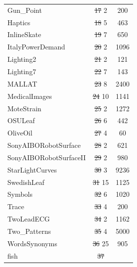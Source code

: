 \documentclass[natbib,smallextended]{svjour3}
\providecommand{\DIFdeltex}[1]{{\protect\color{red}\sout{#1}}}                      %
\providecommand{\DIFdelFL}[1]{\DIFdel{#1}} %
\providecommand{\DIFdelbeginFL}{} %
\providecommand{\DIFdelendFL}{} %
\providecommand{\DIFdel}[1]{\texorpdfstring{\DIFdeltex{#1}}{}} %
\begin{document}
\begin{table} [h!]
\begin{center}
\begin{tabular}{lcc}
Gun\_Point &   \DIFdelbeginFL \DIFdelFL{17 }%
\DIFdelendFL 2 &  200 \\
Haptics &   \DIFdelbeginFL \DIFdelFL{18 }%
\DIFdelendFL 5 &  463 \\
InlineSkate  &  \DIFdelbeginFL \DIFdelFL{19 }%
\DIFdelendFL 7 &  650 \\
ItalyPowerDemand  &  \DIFdelbeginFL \DIFdelFL{20 }%
\DIFdelendFL 2 & 1096 \\
Lighting2  &  \DIFdelbeginFL \DIFdelFL{21 }%
\DIFdelendFL 2 &  121 \\
Lighting7  &  \DIFdelbeginFL \DIFdelFL{22 }%
\DIFdelendFL 7 &  143 \\
MALLAT  &  \DIFdelbeginFL \DIFdelFL{23 }%
\DIFdelendFL 8 & 2400 \\
MedicalImages  & \DIFdelbeginFL \DIFdelFL{24 }%
\DIFdelendFL 10 & 1141 \\
MoteStrain  &  \DIFdelbeginFL \DIFdelFL{25 }%
\DIFdelendFL 2 & 1272 \\
OSULeaf &   \DIFdelbeginFL \DIFdelFL{26 }%
\DIFdelendFL 6 &  442 \\
OliveOil &   \DIFdelbeginFL \DIFdelFL{27 }%
\DIFdelendFL 4 &   60 \\
SonyAIBORobotSurface &   \DIFdelbeginFL \DIFdelFL{28 }%
\DIFdelendFL 2 &  621 \\
SonyAIBORobotSurfaceII &   \DIFdelbeginFL \DIFdelFL{29 }%
\DIFdelendFL 2 &  980 \\
StarLightCurves  &  \DIFdelbeginFL \DIFdelFL{30 }%
\DIFdelendFL 3 & 9236 \\
SwedishLeaf & \DIFdelbeginFL \DIFdelFL{31 }%
\DIFdelendFL 15 & 1125 \\
Symbols  &  \DIFdelbeginFL \DIFdelFL{32 }%
\DIFdelendFL 6 & 1020 \\
Trace &   \DIFdelbeginFL \DIFdelFL{33 }%
\DIFdelendFL 4 &  200 \\
TwoLeadECG  &  \DIFdelbeginFL \DIFdelFL{34 }%
\DIFdelendFL 2 & 1162 \\
Two\_Patterns  &  \DIFdelbeginFL \DIFdelFL{35 }%
\DIFdelendFL 4 & 5000 \\
WordsSynonyms  & \DIFdelbeginFL \DIFdelFL{36 }%
\DIFdelendFL 25 &  905 \\
fish  &  \DIFdelbeginFL \DIFdelFL{37 }%

\end{tabular}
\end{center}
\end{table}
\end{document}
